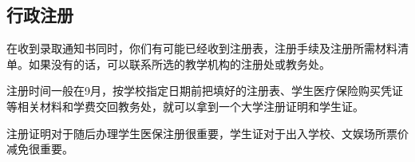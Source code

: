 \subsection{行政注册}

在收到录取通知书同时，你们有可能已经收到注册表，注册手续及注册所需材料清单。如果没有的话，可以联系所选的教学机构的注册处或教务处。

注册时间一般在9月，按学校指定日期前把填好的注册表、学生医疗保险购买凭证等相关材料和学费交回教务处，就可以拿到一个大学注册证明和学生证。

注册证明对于随后办理学生医保注册很重要，学生证对于出入学校、文娱场所票价减免很重要。
